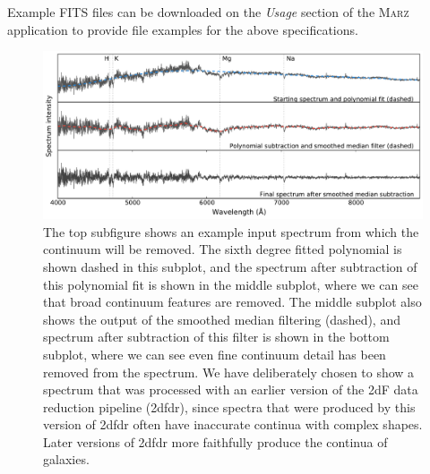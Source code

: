 \documentclass[5p]{elsarticle}
\newcommand{\marz}{\textsc{Marz}}
\begin{document}
Example FITS files can be downloaded on the \textit{Usage} section of the \marz{} application to provide file examples for the above specifications.









\begin{figure}[t]
\centering
\includegraphics[width=\textwidth]{continuum.pdf}
\caption{The top subfigure shows an example input spectrum from which the continuum will be removed. The sixth degree fitted polynomial is shown dashed in this subplot, and the spectrum after subtraction of this polynomial fit is shown in the middle subplot, where we can see that broad continuum features are removed. The middle subplot also shows the output of the smoothed median filtering (dashed), and spectrum after subtraction of this filter is shown in the bottom subplot, where we can see even fine continuum detail has been removed from the spectrum. We have deliberately chosen to show a spectrum that was processed with an earlier version of the 2dF data reduction pipeline (2dfdr), since spectra that were produced by this version of 2dfdr often have inaccurate continua with complex shapes. Later versions of 2dfdr more faithfully produce the continua of galaxies.}
\label{fig:continuum}
\end{figure}
\end{document}
